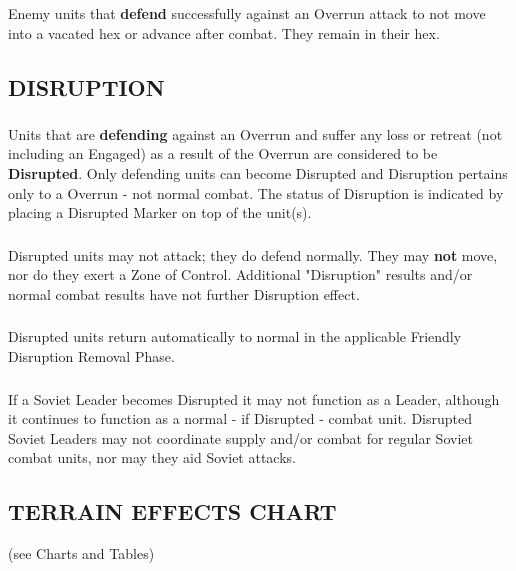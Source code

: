 \subsubsection{} Enemy units that \textbf{defend} successfully against an Overrun attack to not move into a vacated hex or advance after combat. They remain in their hex.

\subsection{DISRUPTION}

\subsubsection{} Units that are \textbf{defending} against an Overrun and suffer any loss or retreat (not including an Engaged) as a result of the Overrun are considered to be \textbf{Disrupted}. Only defending units can become Disrupted and Disruption pertains only to a Overrun - not normal combat. The status of Disruption is indicated by placing a Disrupted Marker on top of the unit(s).

\subsubsection{} Disrupted units may not attack; they do defend normally. They may \textbf{not} move, nor do they exert a Zone of Control. Additional "Disruption" results and/or normal combat results have not further Disruption effect.

\subsubsection{} Disrupted units return automatically to normal in the applicable Friendly Disruption Removal Phase.

\subsubsection{} If a Soviet Leader becomes Disrupted it may not function as a Leader, although it continues to function as a normal - if Disrupted - combat unit. Disrupted Soviet Leaders may not coordinate supply and/or combat for regular Soviet combat units, nor may they aid Soviet attacks.

\subsection{TERRAIN EFFECTS CHART} (see Charts and Tables)
